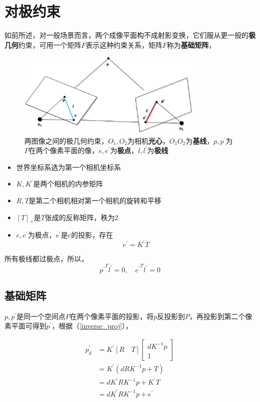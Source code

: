 \section{对极约束}
	如前所述，对一般场景而言，两个成像平面构不成射影变换，它们服从更一般的\textbf{极几何}约束，可用一个矩阵$F$表示这种约束关系，矩阵$F$称为\textbf{基础矩阵}，
	\begin{figure}[H]
		\begin{center}
			\includegraphics[width=0.8\textwidth]{images/base_matrix.png}
		\end{center}
		\caption{两图像之间的极几何约束，$O_1,O_2$为相机\textbf{光心}，$O_1O_2$为\textbf{基线}，$p,p^{\prime}$为$P$在两个像素平面的像，$e,e^\prime$为\textbf{极点}，$l,l^{\prime}$为\textbf{极线}}
	\end{figure}
	\begin{itemize}
		\item 世界坐标系选为第一个相机坐标系
		\item $K,K^{\prime}$是两个相机的内参矩阵
		\item $R,T$是第二个相机相对第一个相机的旋转和平移
		\item $[T]_{\times}$是$T$张成的反称矩阵，秩为$2$
		\item $e,e^\prime$为极点，$e^\prime$是$e$的投影，存在
			$$
				e^\prime =K^\prime T
			$$	
	\end{itemize}

	所有极线都过极点，所以，
	$$
		{p^\prime}^T l^\prime = 0, \quad {e^\prime}^T l^\prime = 0
	$$
	\subsection*{基础矩阵}
		$p,p^\prime$是同一个空间点$P$在两个像素平面的投影，将$p$反投影到$P$，再投影到第二个像素平面可得到$p^\prime$，根据（\ref{inverse_proj}），

		\begin{align}
			p^{\prime}_d &= K^{\prime}[R\quad T]
			\begin{bmatrix}
				dK^{-1}p\\
				1
			\end{bmatrix}\nonumber\\
			&= K^{\prime}\left(dRK^{-1}p + T\right)\nonumber\\
			&= dK^{\prime}RK^{-1}p + K^{\prime}T\label{f_inverse}\\
			&= dK^{\prime}RK^{-1}p + e^\prime\label{f_inverse_e}
		\end{align}

